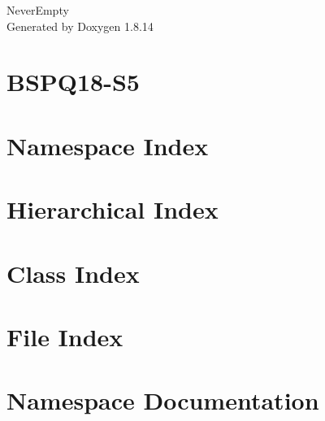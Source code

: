 \documentclass[twoside]{book}
\newcommand{\+}{\discretionary{\mbox{\scriptsize$\hookleftarrow$}}{}{}}
\newcommand{\clearemptydoublepage}{%
  \newpage{\pagestyle{empty}\cleardoublepage}%
}
\begin{document}
\hypersetup{pageanchor=false,
             bookmarksnumbered=true,
             pdfencoding=unicode
            }
\begin{titlepage}
\vspace*{7cm}
\begin{center}%
{\Large Never\+Empty }\\
\vspace*{1cm}
{\large Generated by Doxygen 1.8.14}\\
\end{center}
\end{titlepage}
\clearemptydoublepage
{}
\tableofcontents
\clearemptydoublepage
{}
\hypersetup{pageanchor=true}

\chapter{B\+S\+P\+Q18-\/\+S5}
\label{md__r_e_a_d_m_e}

\chapter{Namespace Index}

\chapter{Hierarchical Index}

\chapter{Class Index}

\chapter{File Index}

\chapter{Namespace Documentation}











\end{document}
